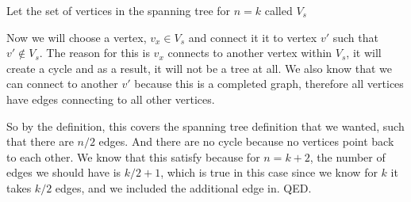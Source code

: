 \documentclass[12pt,fleqn]{article}
\begin{document}
\begin{enumerate}
\begin{enumerate}
  	Let the set of vertices in the spanning tree for $n = k$ called $V_s$
  	
  	Now we will choose a vertex, $v_x \in V_s$ and connect it it to vertex $v'$ such that $v' \not\in V_s$. The reason for this is $v_x$ connects to another vertex within $V_s$, it will create a cycle and as a result, it will not be a tree at all. We also know that we can connect to another $v'$ because this is a completed graph, therefore all vertices have edges connecting to all other vertices. 
  	
  	So by the definition, this covers the spanning tree definition that we wanted, such that there are $n/2$ edges. And there are no cycle because no vertices point back to each other. We know that this satisfy because for $n = k+2$, the number of edges we should have is $k/2 + 1$, which is true in this case since we know for $k$ it takes $k/2$ edges, and we included the additional edge in. QED.
  \end{enumerate}
  

\end{enumerate}
\end{document}
